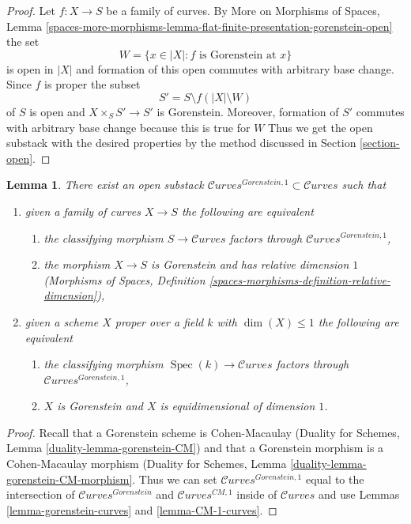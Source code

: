 \documentclass{stacks-project}
\theoremstyle{plain}
\newtheorem{lemma}[subsection]{Lemma}
\theoremstyle{definition}
\theoremstyle{remark}
\numberwithin{equation}{subsection}
\def\Spec{\mathop{\mathrm{Spec}}}
\def\Curvesstack{\mathcal{C}\!\mathit{urves}}
\begin{document}
\begin{proof}
Let $f : X \to S$ be a family of curves. By
More on Morphisms of Spaces, Lemma
\ref{spaces-more-morphisms-lemma-flat-finite-presentation-gorenstein-open}
the set
$$
W = \{x \in |X| : f \text{ is Gorenstein at }x\}
$$
is open in $|X|$ and formation of this open commutes with arbitrary
base change. Since $f$ is proper the subset
$$
S' = S \setminus f(|X| \setminus W)
$$
of $S$ is open and $X \times_S S' \to S'$ is Gorenstein.
Moreover, formation of $S'$ commutes with arbitrary base
change because this is true for $W$
Thus we get the open substack with the desired properties
by the method discussed in Section \ref{section-open}.
\end{proof}

\begin{lemma}
\label{lemma-gorenstein-1-curves}
There exist an open substack
$\Curvesstack^{Gorenstein, 1} \subset \Curvesstack$ such that
\begin{enumerate}
\item given a family of curves $X \to S$ the following are equivalent
\begin{enumerate}
\item the classifying morphism $S \to \Curvesstack$ factors
through $\Curvesstack^{Gorenstein, 1}$,
\item the morphism $X \to S$ is Gorenstein and has
relative dimension $1$ (Morphisms of Spaces, Definition
\ref{spaces-morphisms-definition-relative-dimension}),
\end{enumerate}
\item given a scheme $X$ proper over a field $k$ with $\dim(X) \leq 1$
the following are equivalent
\begin{enumerate}
\item the classifying morphism $\Spec(k) \to \Curvesstack$ factors
through $\Curvesstack^{Gorenstein, 1}$,
\item $X$ is Gorenstein and $X$ is equidimensional of
dimension $1$.
\end{enumerate}
\end{enumerate}
\end{lemma}

\begin{proof}
Recall that a Gorenstein scheme is Cohen-Macaulay
(Duality for Schemes, Lemma \ref{duality-lemma-gorenstein-CM})
and that
a Gorenstein morphism is a Cohen-Macaulay morphism
(Duality for Schemes, Lemma \ref{duality-lemma-gorenstein-CM-morphism}.
Thus we can set
$\Curvesstack^{Gorenstein, 1}$ equal to the intersection
of $\Curvesstack^{Gorenstein}$ and $\Curvesstack^{CM, 1}$
inside of $\Curvesstack$ and use
Lemmas \ref{lemma-gorenstein-curves} and \ref{lemma-CM-1-curves}.
\end{proof}
\end{document}
